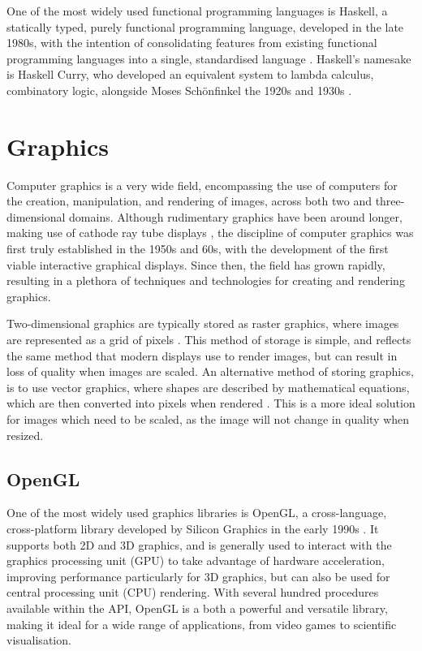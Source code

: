 \documentclass[../main.tex]{subfiles}
\begin{document}
        One of the most widely used functional programming languages is Haskell, a
            statically typed, purely functional programming language, developed in the late
            1980s, with the intention of consolidating features from existing functional
            programming languages into a single, standardised language
            \citep{haskellConference}.
        Haskell's namesake is Haskell Curry, who developed an equivalent system to
            lambda calculus, combinatory logic, alongside Moses Schönfinkel the 1920s and
            1930s \citep{combinatoryLogic}.

    \section{Graphics}
        Computer graphics is a very wide field, encompassing the use of computers for
            the creation, manipulation, and rendering of images, across both two and
            three-dimensional domains.
        Although rudimentary graphics have been around longer, making use of cathode
            ray tube displays \citep{crtBraun}, the discipline of computer graphics was
            first truly established in the 1950s and 60s, with the development of the first
            viable interactive graphical displays.
        Since then, the field has grown rapidly, resulting in a plethora of techniques
            and technologies for creating and rendering graphics.

        Two-dimensional graphics are typically stored as raster graphics, where images
            are represented as a grid of pixels \citep{rasterGraphics}.
        This method of storage is simple, and reflects the same method that modern
            displays use to render images, but can result in loss of quality when images
            are scaled.
        An alternative method of storing graphics, is to use vector graphics, where
            shapes are described by mathematical equations, which are then converted into
            pixels when rendered \citep{vectorGraphics}.
        This is a more ideal solution for images which need to be scaled, as the image
            will not change in quality when resized.

        \subsection{OpenGL}
            One of the most widely used graphics libraries is OpenGL, a cross-language,
                cross-platform library developed by Silicon Graphics in the early 1990s
                \citep{openGL}.
            It supports both 2D and 3D graphics, and is generally used to interact with the
                graphics processing unit (GPU) to take advantage of hardware acceleration,
                improving performance particularly for 3D graphics, but can also be used for
                central processing unit (CPU) rendering.
            With several hundred procedures available within the API, OpenGL is a both a
                powerful and versatile library, making it ideal for a wide range of
                applications, from video games to scientific visualisation.
\end{document}
